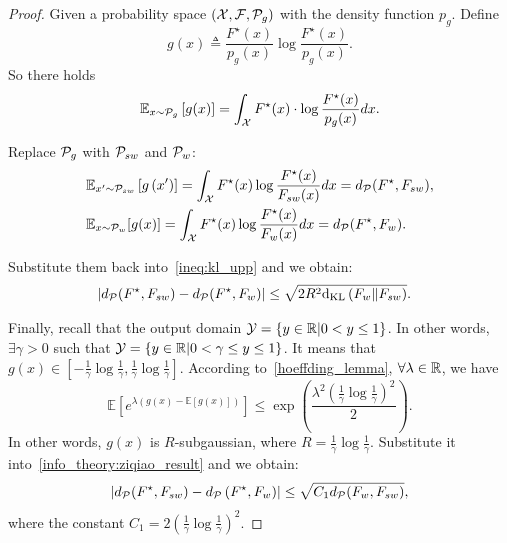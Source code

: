 \begin{proof}
Given a probability space $(\mathcal{X}, \mathcal{F}, \mathcal{P}_g)$ with the density function $p_g$. Define 
$$g(x) \triangleq \frac{F^\star(x)}{p_g(x)} \log \frac{F^\star(x)}{p_g(x)}.$$
So there holds
$$\mathbb{E}_{x \sim \mathcal{P}_g} \left[g(x)\right] = \int_{\mathcal{X}} F^\star(x) \cdot \log \frac{F^\star(x)}{p_g(x)} d x.$$

Replace $\mathcal{P}_g$ with $\mathcal{P}_{sw}$ and $\mathcal{P}_w$:
\begin{align*}
    & \mathbb{E}_{x^{\prime} \sim \mathcal{P}_{sw}}\left[g\left(x^{\prime}\right)\right] = \int_{\mathcal{X}} F^\star(x) \log \frac{F^\star(x)}{F_{sw}(x)} d x = d_\mathcal{P}(F^\star, F_{sw}), \\
    & \mathbb{E}_{x \sim \mathcal{P}_w}[g(x)] = \int_{\mathcal{X}} F^\star(x) \log \frac{F^\star(x)}{F_{w}(x)} d x = d_\mathcal{P}(F^\star, F_{w}).
\end{align*}


Substitute them back into~\eqref{ineq:kl_upp} and we obtain:
\begin{align} \label{info_theory:ziqiao_result}
& \left| d_\mathcal{P}(F^\star, F_{sw}) - d_\mathcal{P}(F^\star, F_{w}) \right| \le \sqrt{2 R^2 \mathrm{d}_{\mathrm{KL}}\left( F_w \| F_{sw} \right)}.
\end{align}

Finally, 
recall that the output domain $\mathcal{Y} = \{ y \in \mathbb{R}| 0 < y \le 1 \}$. In other words, $\exists \gamma>0$ such that $\mathcal{Y} = \{ y \in \mathbb{R}| 0 < \gamma \le y \le 1 \}$.
It means that $g(x) \in [-\frac{1}{\gamma} \log \frac{1}{\gamma}, \frac{1}{\gamma} \log \frac{1}{\gamma}]$.
According to~\cref{hoeffding_lemma}, $\forall \lambda \in \mathbb{R}$, we have
$$\mathbb{E}\left[e^{\lambda(g(x)-\mathbb{E}[g(x)])}\right] \leq \exp \left(\frac{\lambda^2 \left(\frac{1}{\gamma} \log \frac{1}{\gamma}\right)^2}{2}\right).$$
In other words, $g(x)$ is $R$-subgaussian, where $R=\frac{1}{\gamma} \log \frac{1}{\gamma}$.
Substitute it into~\cref{info_theory:ziqiao_result} and we obtain:
\begin{align*}
    \left| d_\mathcal{P}(F^\star, F_{sw}) - d_\mathcal{P}\left( F^\star, F_w \right) \right| \le \sqrt{C_1 d_\mathcal{P}(F_w, F_{sw})},
\end{align*}
where the constant $C_1 = 2\left(\frac{1}{\gamma} \log \frac{1}{\gamma} \right)^2$.
\end{proof}

















